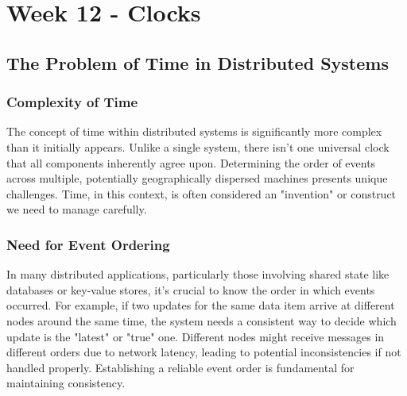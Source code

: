 \section{Week 12 - Clocks}

\subsection{The Problem of Time in Distributed Systems}

\subsubsection{Complexity of Time}
The concept of time within distributed systems is significantly more complex than it initially appears. Unlike a single system, there isn't one universal clock that all components inherently agree upon. Determining the order of events across multiple, potentially geographically dispersed machines presents unique challenges. Time, in this context, is often considered an "invention" or construct we need to manage carefully.

\subsubsection{Need for Event Ordering}
In many distributed applications, particularly those involving shared state like databases or key-value stores, it's crucial to know the order in which events occurred. For example, if two updates for the same data item arrive at different nodes around the same time, the system needs a consistent way to decide which update is the "latest" or "true" one. Different nodes might receive messages in different orders due to network latency, leading to potential inconsistencies if not handled properly. Establishing a reliable event order is fundamental for maintaining consistency.

